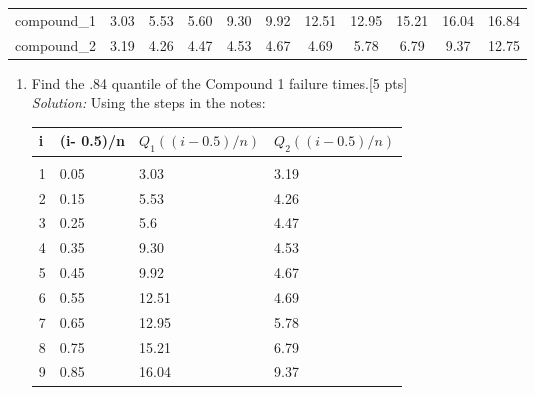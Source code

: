 \documentclass[11pt]{article}\usepackage[]{graphicx}\usepackage[]{color}
\begin{document}
\begin{enumerate}
\begin{center}
	\begin{tabular}{|ccccccccccc|}	
		\hline
		compound_1  & 3.03 & 5.53 & 5.60 & 9.30 & 9.92 & 12.51 & 12.95 & 15.21 & 16.04 & 16.84\\
		compound_2 & 3.19 & 4.26 & 4.47 & 4.53 & 4.67 & 4.69 & 5.78 & 6.79 & 9.37 & 12.75\\
		\hline
	\hline                 
	\end{tabular}
\end{center}

\begin{enumerate}
    \item Find the .84 quantile of the Compound 1 failure times.[5 pts]\\
    \emph{Solution:} Using the steps in the notes:\\
    
     \begin{table}[h!]
     \centering
     \begin{tabular}{|l|p{2cm}|p{3cm}|p{3cm}|}
        \hline
                    \textbf{i}      & \textbf{(i- 0.5)/n} & \textbf{$Q_{1}((i- 0.5)/n)$} & \textbf{$Q_{2}((i- 0.5)/n)$}  \\\hline \hline
                    &  &  &  \\
      1   &  0.05 & 3.03 & 3.19 \\

      2   &  0.15 & 5.53 & 4.26 \\

      3   &  0.25 & 5.6 & 4.47 \\

      4   &  0.35 & 9.30 & 4.53 \\

      5  &  0.45 & 9.92 & 4.67 \\

      6  &  0.55 & 12.51 & 4.69 \\

      7  &  0.65 & 12.95 & 5.78 \\
      
      8  &  0.75 & 15.21 & 6.79 \\
      
      9  &  0.85 & 16.04 & 9.37 \\
      

\end{tabular}
\end{table}
\end{enumerate}
\end{enumerate}
\end{document}
